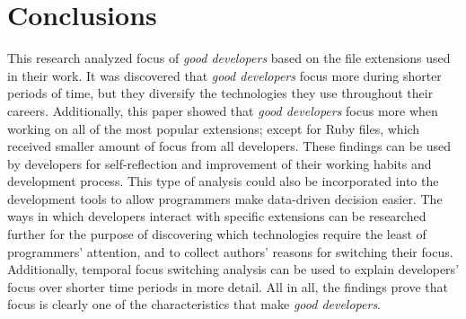 
\chapter{Conclusions}\label{chapter:conclusions}
This research analyzed focus of \textit{good developers} based on the file extensions  used in their work. It was discovered that \textit{good developers} focus more during shorter periods of time, but they diversify the technologies they use throughout their careers. Additionally, this paper showed that \textit{good developers} focus more when working on all of the most popular extensions; except for Ruby files, which received smaller amount of focus from all developers. These findings can be used by developers for self-reflection and improvement of their working habits and development process. This type of analysis could also be incorporated into the development tools to allow programmers make data-driven decision easier. The ways in which developers interact with specific extensions can be researched further for the purpose of discovering which technologies require the least of programmers’ attention, and to collect authors’ reasons for switching their focus. Additionally, temporal focus switching analysis can be used to explain developers’ focus over shorter time periods in more detail. All in all, the findings prove that focus is clearly one of the characteristics that make \textit{good developers}.